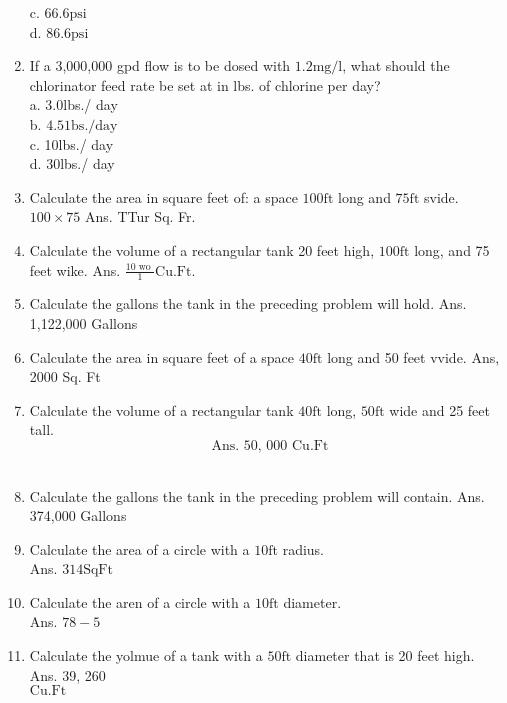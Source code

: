 \begin{enumerate}
c. $66.6 \mathrm{psi}$\\
d. $86.6 \mathrm{psi}$\\
\item If a 3,000,000 gpd flow is to be dosed with $1.2 \mathrm{mg} / \mathrm{l}$, what should the chlorinator feed rate be set at in lbs. of chlorine per day?\\
a. 3.0lbs./ day\\
b. $4.5 \mathrm{1bs} . / \mathrm{day}$\\
c. 10lbs./ day\\
d. 30lbs./ day\\
\item Calculate the area in square feet of: a space $100 \mathrm{ft}$ long and $75 \mathrm{ft}$ svide. $100 \times 75$ Ans. TTur Sq. Fr.\\
\item Calculate the volume of a rectangular tank 20 feet high, $100 \mathrm{ft}$ long, and 75 feet wike. Ans. $\frac{10 \text { wo }}{1} \mathrm{Cu} . \mathrm{Ft}$.\\
\item Calculate the gallons the tank in the preceding problem will hold. Ans. 1,122,000 Gallons\\
\item Calculate the area in square feet of a space $40 \mathrm{ft}$ long and 50 feet vvide. Ans, 2000 Sq. Ft\\
\item Calculate the volume of a rectangular tank $40 \mathrm{ft}$ long, $50 \mathrm{ft}$ wide and 25 feet tall.\\
$$
\text { Ans. 50, } 000 \text { Cu.Ft }
$$\\
\item Calculate the gallons the tank in the preceding problem will contain. Ans. 374,000 Gallons\\
\item Calculate the area of a circle with a $10 \mathrm{ft}$ radius.\\
Ans. $314 \mathrm{Sq} \mathrm{Ft}$\\
\item Calculate the aren of a circle with a $10 \mathrm{ft}$ diameter.\\
Ans. $78-5$\\
\item Calculate the yolmue of a tank with a $50 \mathrm{ft}$ diameter that is 20 feet high.\\
Ans. 39, 260\\
$\mathrm{Cu} . \mathrm{Ft}$\\

\end{enumerate}
